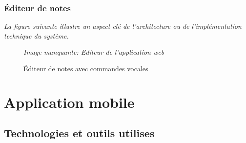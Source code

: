 \subsubsection{Éditeur de notes}
\noindent
\textit{La figure suivante illustre un aspect clé de l'architecture ou de l'implémentation technique du système.}
\begin{figure}[H]
\centering
\textit{Image manquante: Editeur de l'application web}
\caption{Éditeur de notes avec commandes vocales}
\label{fig:web-editor}
\end{figure}

\section{Application mobile}
\subsection{Technologies et outils utilises}

